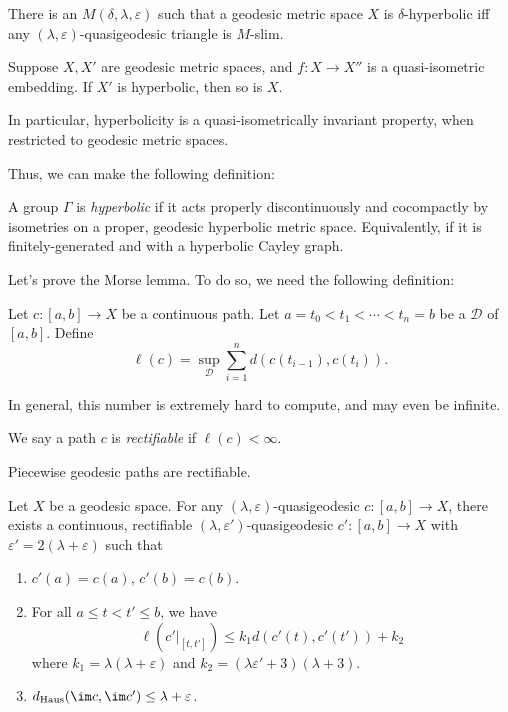 \documentclass[a4paper]{article}
\begin{document}
\begin{cor}
  There is an $M(\delta, \lambda, \varepsilon)$ such that a geodesic metric space $X$ is $\delta$-hyperbolic iff any $(\lambda, \varepsilon)$-quasigeodesic triangle is $M$-slim.
\end{cor}

\begin{cor}
  Suppose $X, X'$ are geodesic metric spaces, and $f: X \to X''$ is a quasi-isometric embedding. If $X'$ is hyperbolic, then so is $X$.

  In particular, hyperbolicity is a quasi-isometrically invariant property, when restricted to geodesic metric spaces.
\end{cor}

Thus, we can make the following definition:
\begin{defi}
  A group $\Gamma$ is \emph{hyperbolic} if it acts properly discontinuously and cocompactly by isometries on a proper, geodesic hyperbolic metric space. Equivalently, if it is finitely-generated and with a hyperbolic Cayley graph.
\end{defi}

Let's prove the Morse lemma. To do so, we need the following definition:
\begin{defi}
  Let $c: [a, b] \to X$ be a continuous path. Let $a = t_0 < t_1 < \cdots < t_n = b$ be a  $\mathcal{D}$ of $[a, b]$. Define
  \[
    \ell (c) = \sup_{\mathcal{D}} \sum_{i = 1}^n d(c(t_{i - 1}), c(t_i)).
  \]
\end{defi}
In general, this number is extremely hard to compute, and may even be infinite.

\begin{defi}
  We say a path $c$ is \emph{rectifiable} if $\ell(c) < \infty$.
\end{defi}

\begin{eg}
  Piecewise geodesic paths are rectifiable.
\end{eg}

\begin{lemma}
  Let $X$ be a geodesic space. For any $(\lambda, \varepsilon)$-quasigeodesic $c: [a, b] \to X$, there exists a continuous, rectifiable $(\lambda, \varepsilon')$-quasigeodesic $c': [a, b] \to X$ with $\varepsilon' = 2(\lambda + \varepsilon)$ such that
  \begin{enumerate}
    \item $c'(a) = c(a)$, $c'(b) = c(b)$.
    \item For all $a \leq t < t' \leq b$, we have
      \[
        \ell(c'|_{[t, t']}) \leq k_1 d(c'(t), c'(t')) + k_2
      \]
      where $k_1 = \lambda (\lambda + \varepsilon)$ and $k_2 = (\lambda \varepsilon' + 3)(\lambda + 3)$.
    \item $d_{\mathrm{Haus}}(\im c, \im c') \leq \lambda + \varepsilon$.
  \end{enumerate}
\end{lemma}
\end{document}
